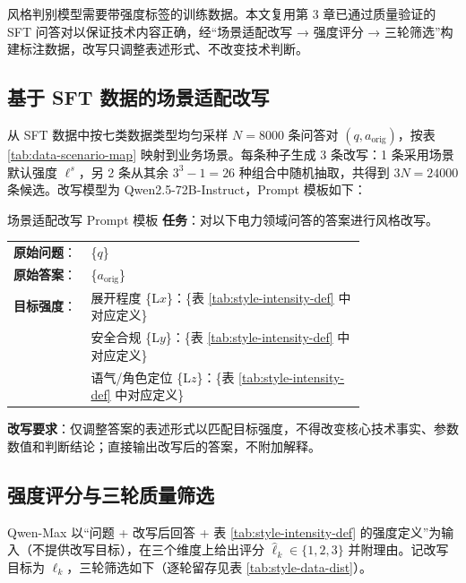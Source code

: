\documentclass[fontset=fandol,type=master,campus=shenzhen,etitleauto=true]{hithesisbook}
\begin{document}
风格判别模型需要带强度标签的训练数据。本文复用第 3 章已通过质量验证的 SFT 问答对以保证技术内容正确，经“场景适配改写 → 强度评分 → 三轮筛选”构建标注数据，改写只调整表述形式、不改变技术判断。

\subsection{基于 SFT 数据的场景适配改写}\label{ux57faux4e8e-sft-ux6570ux636eux7684ux573aux666fux9002ux914dux6539ux5199}

从 SFT 数据中按七类数据类型均匀采样 $N = 8000$ 条问答对 $(q, a_{\text{orig}})$，按表 \ref{tab:data-scenario-map} 映射到业务场景。每条种子生成 3 条改写：1 条采用场景默认强度 $\boldsymbol{\ell}^{s}$，另 2 条从其余 $3^3 - 1 = 26$ 种组合中随机抽取，共得到 $3N = 24000$ 条候选。改写模型为 Qwen2.5-72B-Instruct，Prompt 模板如下：

\begin{promptbox}{场景适配改写 Prompt 模板}
\textbf{任务}：对以下电力领域问答的答案进行风格改写。\par\smallskip
\begin{tabular}{@{}l@{\;}p{0.78\linewidth}@{}}
\textbf{原始问题}： & \{$q$\} \\
\textbf{原始答案}： & \{$a_{\text{orig}}$\} \\
\textbf{目标强度}： & 展开程度 \{L$x$\}：\{表 \ref{tab:style-intensity-def} 中对应定义\} \\
 & 安全合规 \{L$y$\}：\{表 \ref{tab:style-intensity-def} 中对应定义\} \\
 & 语气/角色定位 \{L$z$\}：\{表 \ref{tab:style-intensity-def} 中对应定义\} \\
\end{tabular}\par\smallskip
\textbf{改写要求}：仅调整答案的表述形式以匹配目标强度，不得改变核心技术事实、参数数值和判断结论；直接输出改写后的答案，不附加解释。
\end{promptbox}

\subsection{强度评分与三轮质量筛选}\label{ux4e09ux8f6eux8d28ux91cfux7b5bux9009}

Qwen-Max 以“问题 + 改写后回答 + 表 \ref{tab:style-intensity-def} 的强度定义”为输入（不提供改写目标），在三个维度上给出评分 $\hat{\ell}_k \in \{1, 2, 3\}$ 并附理由。记改写目标为 $\ell_k$，三轮筛选如下（逐轮留存见表 \ref{tab:style-data-dist}）。
\end{document}
